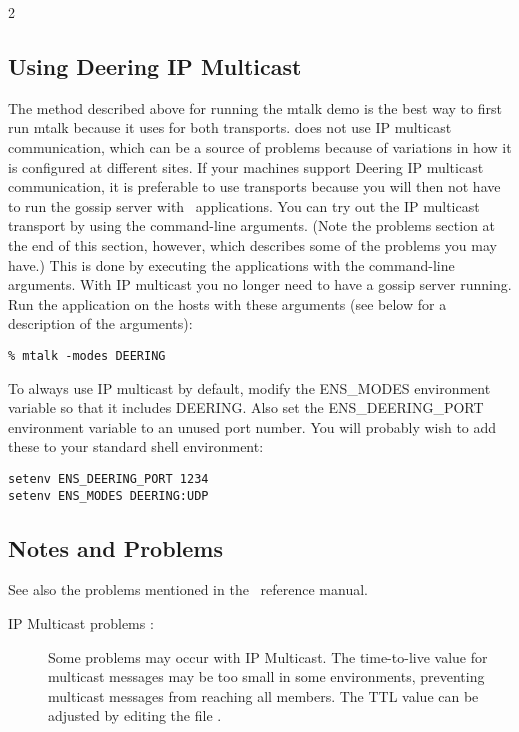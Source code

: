 2\subsection{Using Deering IP Multicast}

The method described above for running the mtalk demo is the best way
to first run mtalk because it uses  for both
transports.  does not use IP multicast communication,
which can be a source of problems because of variations in how it is
configured at different sites.    If your machines support Deering IP
multicast communication, it is preferable to use 
transports because you will then not have to run the gossip server
with \ensemble\ applications.  You can try out the IP multicast
transport by using the command-line arguments.  (Note the problems
section at the end of this section, however, which describes some of
the problems you may have.)  This is done by executing the
applications with the  command-line arguments.  With IP
multicast you no longer need to have a gossip server running.  Run
the application on the hosts with these arguments (see below for a
description of the arguments):
\begin{verbatim}
% mtalk -modes DEERING
\end{verbatim}
To always use IP multicast by default, modify the ENS\_MODES
environment variable so that it includes DEERING.  Also set the
ENS\_DEERING\_PORT environment variable to an unused port number.
You will probably wish to add these to your standard shell
environment:
\begin{verbatim}
setenv ENS_DEERING_PORT 1234
setenv ENS_MODES DEERING:UDP
\end{verbatim}

\subsection{Notes and Problems}

See also the problems mentioned in the \ensemble\ reference manual.
\begin{description}
\item
[IP Multicast problems :] Some problems may occur with IP Multicast.
The time-to-live value for multicast messages may be too small in
some environments, preventing multicast messages from reaching all
members.  The TTL value can be adjusted by editing the file
.
\end{description}
